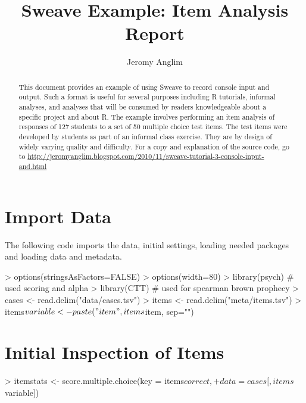 \documentclass[a4paper]{article}
\begin{document}
\title{Sweave Example: Item Analysis Report}
\author{Jeromy Anglim}

\maketitle






\begin{abstract}
This document provides an example of using Sweave 
to record console input and output.
Such a format is useful for several purposes including
R tutorials, informal analyses, and analyses that will be consumed
by readers knowledgeable about a specific project and about R.
The example involves performing an item analysis of 
responses of 127 students 
to a set of 50 multiple choice test items.
The test items were developed by students as part of an informal
class exercise.
They are by design of widely varying quality and difficulty.
For a copy and explanation of the source code, go to
\url{http://jeromyanglim.blogspot.com/2010/11/sweave-tutorial-3-console-input-and.html}
\end{abstract}

\section{Import Data}
The following code imports the data,
initial settings, loading needed packages and
loading data and metadata.
\begin{Schunk}
\begin{Sinput}
> options(stringsAsFactors=FALSE)
> options(width=80)
> library(psych) # used scoring and alpha
> library(CTT) # used for spearman brown prophecy
> cases <- read.delim("data/cases.tsv")
> items <- read.delim("meta/items.tsv")
> items$variable <- paste("item", items$item, sep="")
\end{Sinput}
\end{Schunk}


\section{Initial Inspection of Items}
\begin{Schunk}
\begin{Sinput}
> itemstats <- score.multiple.choice(key = items$correct, 
+ 			data = cases[,items$variable])
\end{Sinput}
\end{Schunk}
\end{document}

